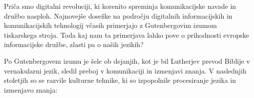 \clearpage



\begin{multicols}{2}

Priča smo digitalni revoluciji, ki korenito spre\-minja komunikacij\-ske navade in družbo nasploh. Naj\-novejše dosežke na področju digitalnih informacij\-skih in komunikacij\-skih tehnologij včasih primerjajo z Gutenbergovim izumom tiskarskega stroja. Toda kaj nam ta primerjava lahko pove o prihodnosti evropske informacij\-ske družbe, zlasti pa o naših jezikih?


Po Gutenbergovem izumu je šele ob dejanjih, kot je bil Lutherjev prevod Biblije v vernakularni jezik, sledil preboj v komunikaciji in izmenjavi znanja. V naslednjih stoletjih so se razvile kulturne tehnike, ki so izpopolnile procesiranje jezika in izmenjavo znanja:


\end{multicols}
